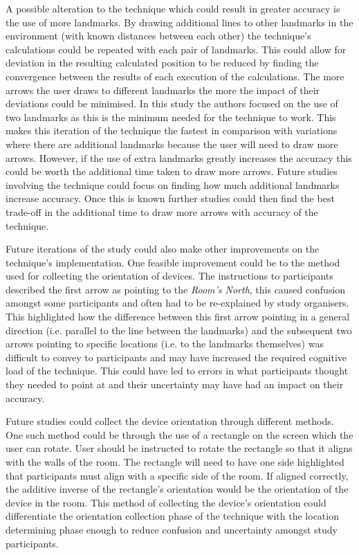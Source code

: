 \documentclass{bmcart}
\begin{document}
A possible alteration to the technique which could result in greater accuracy is the use of more landmarks.
By drawing additional lines to other landmarks in the environment (with known distances between each other) the technique's calculations could be repeated with each pair of landmarks.
This could allow for deviation in the resulting calculated position to be reduced by finding the convergence between the results of each execution of the calculations.
The more arrows the user draws to different landmarks the more the impact of their deviations could be minimised.
In this study the authors focused on the use of two landmarks as this is the minimum needed for the technique to work.
This makes this iteration of the technique the fastest in comparison with variations where there are additional landmarks because the user will need to draw more arrows.
However, if the use of extra landmarks greatly increases the accuracy this could be worth the additional time taken to draw more arrows.
Future studies involving the technique could focus on finding how much additional landmarks increase accuracy.
Once this is known further studies could then find the best trade-off in the additional time to draw more arrows with accuracy of the technique.

Future iterations of the study could also make other improvements on the technique's implementation.
One feasible improvement could be to the method used for collecting the orientation of devices.
The instructions to participants described the first arrow as pointing to the \emph{Room's North}, this caused confusion amongst some participants and often had to be re-explained by study organisers.
This highlighted how the difference between this first arrow pointing in a general direction (i.e. parallel to the line between the landmarks) and the subsequent two arrows pointing to specific locations (i.e. to the landmarks themselves) was difficult to convey to participants and may have increased the required cognitive load of the technique.
This could have led to errors in what participants thought they needed to point at and their uncertainty may have had an impact on their accuracy.

Future studies could collect the device orientation through different methods.
One such method could be through the use of a rectangle on the screen which the user can rotate.
User should be instructed to rotate the rectangle so that it aligns with the walls of the room.
The rectangle will need to have one side highlighted that participants must align with a specific side of the room.
If aligned correctly, the additive inverse of the rectangle's orientation would be the orientation of the device in the room.
This method of collecting the device's orientation could differentiate the orientation collection phase of the technique with the location determining phase enough to reduce confusion and uncertainty amongst study participants.
\end{document}
